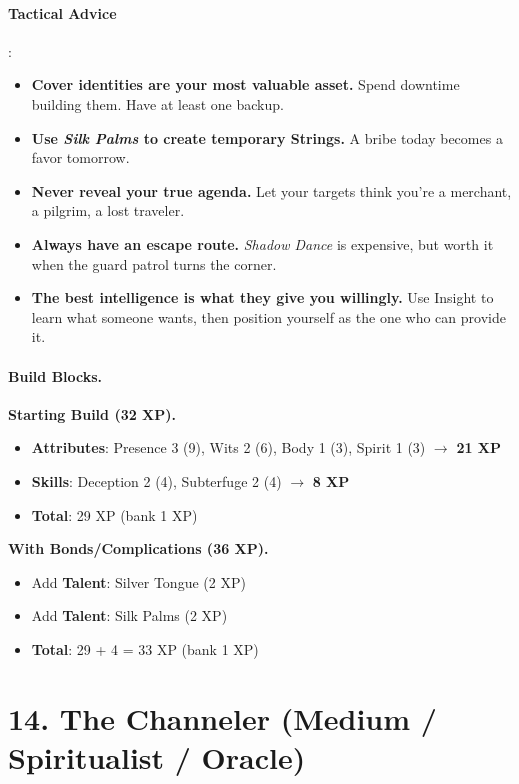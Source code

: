 \paragraph{Tactical Advice}:
\begin{itemize}
\item \textbf{Cover identities are your most valuable asset.} Spend downtime building them. Have at least one backup.
\item \textbf{Use \emph{Silk Palms} to create temporary Strings.} A bribe today becomes a favor tomorrow.
\item \textbf{Never reveal your true agenda.} Let your targets think you're a merchant, a pilgrim, a lost traveler.
\item \textbf{Always have an escape route.} \emph{Shadow Dance} is expensive, but worth it when the guard patrol turns the corner.
\item \textbf{The best intelligence is what they give you willingly.} Use Insight to learn what someone wants, then position yourself as the one who can provide it.
\end{itemize}

\paragraph{Build Blocks.}
\textbf{Starting Build (32 XP).}
\begin{itemize}
\item \textbf{Attributes}: Presence 3 (9), Wits 2 (6), Body 1 (3), Spirit 1 (3) \(\rightarrow\) \textbf{21 XP}
\item \textbf{Skills}: Deception 2 (4), Subterfuge 2 (4) \(\rightarrow\) \textbf{8 XP}
\item \textbf{Total}: 29 XP (bank 1 XP)
\end{itemize}
\textbf{With Bonds/Complications (36 XP).}
\begin{itemize}
\item Add \textbf{Talent}: Silver Tongue (2 XP)
\item Add \textbf{Talent}: Silk Palms (2 XP)
\item \textbf{Total}: 29 + 4 = 33 XP (bank 1 XP)
\end{itemize}

\section{14. The Channeler (Medium / Spiritualist / Oracle)}
\label{sec:concept-channeler}

